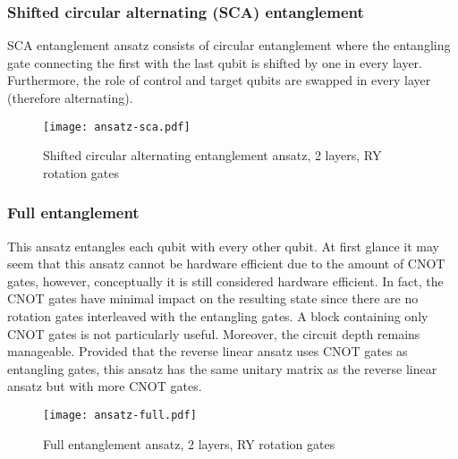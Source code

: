 \subsubsection{Shifted circular alternating (SCA) entanglement}
SCA entanglement ansatz consists of circular entanglement where the entangling gate connecting the first with the last qubit is shifted by one in every layer. Furthermore, the role of control and target qubits are swapped in every layer (therefore alternating).
\begin{figure}[H]
    \centering
    \texttt{[image: ansatz-sca.pdf]}
    \caption{Shifted circular alternating entanglement ansatz, 2 layers, RY rotation gates}
\end{figure}

\subsubsection{Full entanglement}
This ansatz entangles each qubit with every other qubit. At first glance it may seem that this ansatz cannot be hardware efficient due to the amount of CNOT gates, however, conceptually it is still considered hardware efficient. In fact, the CNOT gates have minimal impact on the resulting state since there are no rotation gates interleaved with the entangling gates. A block containing only CNOT gates is not particularly useful. Moreover, the circuit depth remains manageable. Provided that the reverse linear ansatz uses CNOT gates as entangling gates, this ansatz has the same unitary matrix as the reverse linear ansatz but with more CNOT gates.
\begin{figure}[H]
    \centering
    \texttt{[image: ansatz-full.pdf]}
    \caption{Full entanglement ansatz, 2 layers, RY rotation gates}
\end{figure}